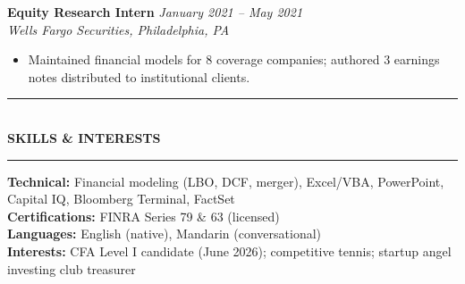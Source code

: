 \documentclass[11pt,a4paper]{article}
\newcommand{\sectionheader}[1]{%
  \vspace{4pt}
  \noindent\rule{\textwidth}{1.0pt}\\[-6pt]
  \noindent\textbf{\large #1}\\[-4pt]
  \rule{\textwidth}{0.4pt}
  \vspace{2pt}
}
\begin{document}
\vspace{4pt}
\noindent\textbf{Equity Research Intern} \hfill \textit{January 2021 -- May 2021}\\
\textit{Wells Fargo Securities, Philadelphia, PA}
\begin{itemize}
  \item Maintained financial models for 8 coverage companies; authored 3 earnings notes distributed to institutional clients.
\end{itemize}

\sectionheader{SKILLS \& INTERESTS}

\noindent\textbf{Technical:} Financial modeling (LBO, DCF, merger), Excel/VBA, PowerPoint, Capital IQ, Bloomberg Terminal, FactSet\\
\textbf{Certifications:} FINRA Series 79 \& 63 (licensed)\\
\textbf{Languages:} English (native), Mandarin (conversational)\\
\textbf{Interests:} CFA Level I candidate (June 2026); competitive tennis; startup angel investing club treasurer
\end{document}
